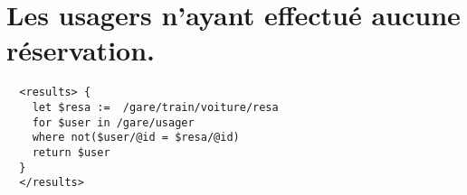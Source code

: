\section{Les usagers n’ayant effectué aucune réservation.}
\begin{verbatim}
  <results> {
    let $resa :=  /gare/train/voiture/resa
    for $user in /gare/usager
    where not($user/@id = $resa/@id)
    return $user
  }
  </results>
\end{verbatim}
